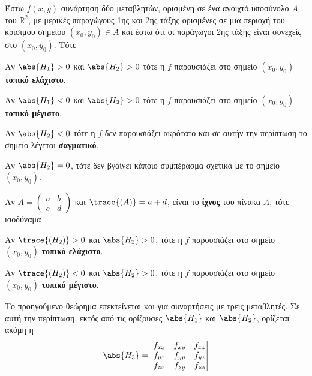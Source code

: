 \documentclass[a4paper,table]{report}
\begin{document}
\begin{mybox2}
\begin{thm}
  \label{thm:2var}
\item {}
  Έστω $ f(x,y) $ συνάρτηση δύο μεταβλητών, ορισμένη σε ένα ανοιχτό 
  υποσύνολο $A$ του $ \mathbb{R}^{2} $, με μερικές παραγώγους 1ης και 2ης τάξης 
  ορισμένες σε μια  περιοχή του κρίσιμου σημείου $ (x_{0}, y_{0}) \in A $ και 
  έστω ότι οι παράγωγοι 2ης τάξης είναι συνεχείς στο $ (x_{0}, y_{0}) $. Τότε
\end{thm}

\begin{myitemize}
  \item Αν $ \abs{H_{1}} > 0 $ και $ \abs{H_{2}} > 0 $ τότε η $f$ παρουσιάζει στο 
    σημείο $ (x_{0}, y_{0}) $ \textbf{τοπικό ελάχιστο}.
  \item Αν $ \abs{H_{1}} < 0 $ και $ \abs{H_{2}} > 0 $ τότε η $f$ παρουσιάζει στο 
    σημείο $ (x_{0}, y_{0}) $ \textbf{τοπικό μέγιστο}.
  \item Αν $ \abs{H_{2}} < 0 $ τότε η $f$ δεν παρουσιάζει ακρότατο και σε αυτήν 
    την περίπτωση το σημείο λέγεται \textbf{σαγματικό}.
  \item Αν $ \abs{H_{2}} = 0 $, τότε δεν βγαίνει κάποιο συμπέρασμα σχετικά με το 
    σημείο $ (x_{0}, y_{0}) $.
\end{myitemize}
\end{mybox2}

\begin{rem}
  Αν $ A = 
  \begin{pmatrix}
    a & b \\
    c & d
  \end{pmatrix}
  $ και $ \trace{(A)} = a + d $, είναι το \textbf{ίχνος} του πίνακα $A$, τότε ισοδύναμα 
  \begin{myitemize}
    \item Αν $ \trace{(H_{2})} > 0 $ και $ \abs{H_{2}} > 0 $, 
      τότε η $f$ παρουσιάζει στο σημείο $ (x_{0}, y_{0}) $ \textbf{τοπικό ελάχιστο}.
    \item Αν $ \trace{(H_{2})} < 0 $ και $ \abs{H_{2}} > 0 $, 
      τότε η $f$ παρουσιάζει στο σημείο $ (x_{0}, y_{0}) $ \textbf{τοπικό μέγιστο}.
  \end{myitemize}
\end{rem}

Το προηγούμενο θεώρημα επεκτείνεται και για συναρτήσεις με τρεις μεταβλητές. Σε αυτή 
την περίπτωση, εκτός από τις ορίζουσες $ \abs{H_{1}} $ και $ \abs{H_{2}} $, ορίζεται 
ακόμη η
\[
  \abs{H_{3}} = 
  \begin{vmatrix}
    f_{xx} & f_{xy} & f_{xz} \\
    f_{yx} & f_{yy} & f_{yz} \\
    f_{zx} & f_{zy} & f_{zz}
  \end{vmatrix} 
  \hfill 
\] 
\end{document}
